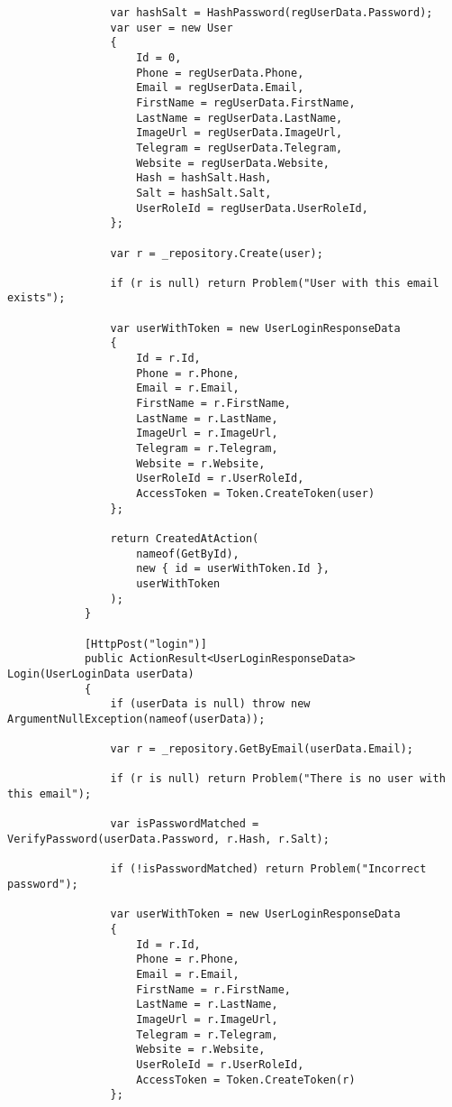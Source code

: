 \begin{lstlisting}
                var hashSalt = HashPassword(regUserData.Password);
                var user = new User
                {
                    Id = 0,
                    Phone = regUserData.Phone,
                    Email = regUserData.Email,
                    FirstName = regUserData.FirstName,
                    LastName = regUserData.LastName,
                    ImageUrl = regUserData.ImageUrl,
                    Telegram = regUserData.Telegram,
                    Website = regUserData.Website,
                    Hash = hashSalt.Hash,
                    Salt = hashSalt.Salt,
                    UserRoleId = regUserData.UserRoleId,
                };
    
                var r = _repository.Create(user);
    
                if (r is null) return Problem("User with this email exists");
    
                var userWithToken = new UserLoginResponseData
                {
                    Id = r.Id,
                    Phone = r.Phone,
                    Email = r.Email,
                    FirstName = r.FirstName,
                    LastName = r.LastName,
                    ImageUrl = r.ImageUrl,
                    Telegram = r.Telegram,
                    Website = r.Website,
                    UserRoleId = r.UserRoleId,
                    AccessToken = Token.CreateToken(user)
                };
                
                return CreatedAtAction(
                    nameof(GetById),
                    new { id = userWithToken.Id },
                    userWithToken
                );
            }
            
            [HttpPost("login")]
            public ActionResult<UserLoginResponseData> Login(UserLoginData userData)
            {
                if (userData is null) throw new ArgumentNullException(nameof(userData));
            
                var r = _repository.GetByEmail(userData.Email);
                
                if (r is null) return Problem("There is no user with this email");
    
                var isPasswordMatched = VerifyPassword(userData.Password, r.Hash, r.Salt);
                
                if (!isPasswordMatched) return Problem("Incorrect password");
            
                var userWithToken = new UserLoginResponseData
                {
                    Id = r.Id,
                    Phone = r.Phone,
                    Email = r.Email,
                    FirstName = r.FirstName,
                    LastName = r.LastName,
                    ImageUrl = r.ImageUrl,
                    Telegram = r.Telegram,
                    Website = r.Website,
                    UserRoleId = r.UserRoleId,
                    AccessToken = Token.CreateToken(r)
                };
                

\end{lstlisting}
